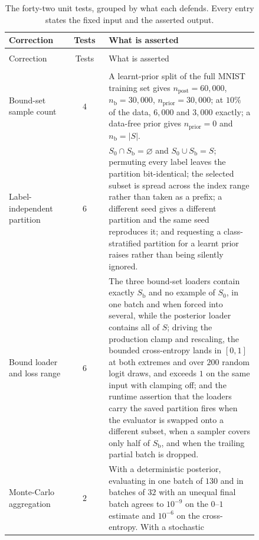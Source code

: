 {\small\begin{longtable}[]{@{}p{0.24\linewidth} c p{0.60\linewidth}@{}}
\caption{The forty-two unit tests, grouped by what each defends. Every
entry states the fixed input and the asserted output.}\label{tab:tests}\\
\toprule\noalign{}
Correction & Tests & What is asserted \\
\midrule\noalign{}\endfirsthead
\multicolumn{3}{@{}l}{\emph{Table \thetable\ continued from previous page}}\\
\toprule\noalign{}
Correction & Tests & What is asserted \\
\midrule\noalign{}\endhead
\midrule\multicolumn{3}{r@{}}{\emph{continued on next page}}\\\endfoot
\bottomrule\noalign{}\endlastfoot
Bound-set sample count & $4$ &
  A learnt-prior split of the full MNIST training set gives
  $n_{\mathrm{post}}=60{,}000$, $n_{\mathrm b}=30{,}000$, $n_{\mathrm{prior}}=30{,}000$;
  at $10\%$ of the data, $6{,}000$ and $3{,}000$ exactly; a data-free prior gives
  $n_{\mathrm{prior}}=0$ and $n_{\mathrm b}=|S|$. \\[2pt]
Label-independent partition & $6$ &
  $S_0\cap S_{\mathrm b}=\varnothing$ and $S_0\cup S_{\mathrm b}=S$; permuting
  every label leaves the partition bit-identical; the selected subset is spread
  across the index range rather than taken as a prefix; a different seed gives a
  different partition and the same seed reproduces it; and requesting a
  class-stratified partition for a learnt prior raises rather than being silently
  ignored. \\[2pt]
Bound loader and loss range & $6$ &
  The three bound-set loaders contain exactly $S_{\mathrm b}$ and no example of
  $S_0$, in one batch and when forced into several, while the posterior loader
  contains all of $S$; driving the production clamp and rescaling, the bounded
  cross-entropy lands in $[0,1]$ at both extremes and over $200$ random logit
  draws, and exceeds $1$ on the same input with clamping off; and the runtime
  assertion that the loaders carry the saved partition fires when the evaluator
  is swapped onto a different subset, when a sampler covers only half of
  $S_{\mathrm b}$, and when the trailing partial batch is dropped. \\[2pt]
Monte-Carlo aggregation & $2$ &
  With a deterministic posterior, evaluating in one batch of $130$ and in
  batches of $32$ with an unequal final batch agrees to $10^{-9}$ on the
  $0$--$1$ estimate and $10^{-6}$ on the cross-entropy. With a stochastic

\end{longtable}}
